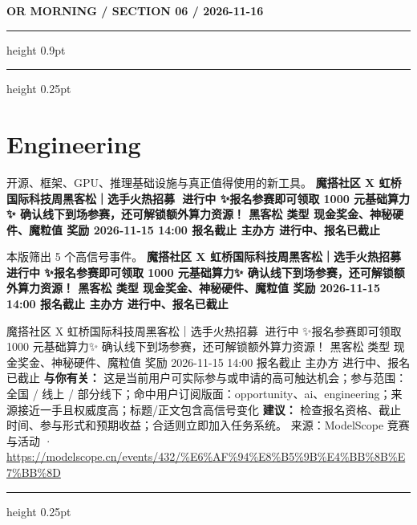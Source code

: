 \documentclass[10.5pt]{ctexart}
\begin{document}
\newpage
{\small\bfseries OR MORNING / SECTION 06 / 2026-11-16}
\vspace{2mm}
\hrule height 0.9pt
\vspace{1.5mm}
\hrule height 0.25pt
\vspace{4mm}
\section*{Engineering}
{\color{ormuted} 开源、框架、GPU、推理基础设施与真正值得使用的新工具。}
\vspace{2mm}
{\LARGE\bfseries 魔搭社区 X 虹桥国际科技周黑客松｜选手火热招募🚀 进行中 ✨报名参赛即可领取 1000 元基础算力✨ 确认线下到场参赛，还可解锁额外算力资源！ 黑客松 类型 现金奖金、神秘硬件、魔粒值 奖励 2026-11-15 14:00 报名截止 主办方 进行中、报名已截止}\par
\vspace{1mm}
{\color{ormuted} 本版筛出 5 个高信号事件。}
\vspace{3mm}
{\Large\bfseries 魔搭社区 X 虹桥国际科技周黑客松｜选手火热招募🚀 进行中 ✨报名参赛即可领取 1000 元基础算力✨ 确认线下到场参赛，还可解锁额外算力资源！ 黑客松 类型 现金奖金、神秘硬件、魔粒值 奖励 2026-11-15 14:00 报名截止 主办方 进行中、报名已截止}\par
魔搭社区 X 虹桥国际科技周黑客松｜选手火热招募🚀 进行中 ✨报名参赛即可领取 1000 元基础算力✨ 确认线下到场参赛，还可解锁额外算力资源！ 黑客松 类型 现金奖金、神秘硬件、魔粒值 奖励 2026-11-15 14:00 报名截止 主办方 进行中、报名已截止
\textbf{与你有关：} 这是当前用户可实际参与或申请的高可触达机会；参与范围：全国 / 线上 / 部分线下；命中用户订阅版面：opportunity、ai、engineering；来源接近一手且权威度高；标题/正文包含高信号变化
\textbf{建议：} 检查报名资格、截止时间、参与形式和预期收益；合适则立即加入任务系统。
{\footnotesize\color{ormuted} 来源：ModelScope 竞赛与活动 · \url{https://modelscope.cn/events/432/%E6%AF%94%E8%B5%9B%E4%BB%8B%E7%BB%8D}}
\vspace{4mm}
\hrule height 0.25pt
\vspace{3mm}
\end{document}

